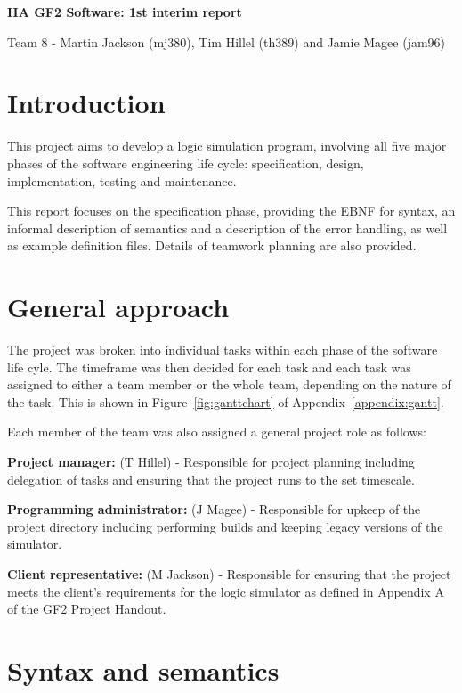 \documentclass[a4paper,10pt]{article}
\begin{document}
\begin{center}
\LARGE \textbf{IIA GF2 Software: 1st interim report}

\small Team 8 - Martin Jackson (mj380), Tim Hillel (th389) and Jamie Magee (jam96)
\end{center}



\section{Introduction}

This project aims to develop a logic simulation program, involving all five major phases of the software engineering life cycle: specification, design, implementation, testing and maintenance.

This report focuses on the specification phase, providing the EBNF for syntax, an informal description of semantics and a description of the error handling, as well as example definition files.
Details of teamwork planning are also provided.

\section{General approach}

The project was broken into individual tasks within each phase of the software life cyle.
The timeframe was then decided for each task and each task was assigned to either a team member or the whole team, depending on the nature of the task.
This is shown in Figure~\ref{fig:ganttchart} of Appendix~\ref{appendix:gantt}.

Each member of the team was also assigned a general project role as follows:

\textbf{Project manager:} (T Hillel) - Responsible for project planning including delegation of tasks and ensuring that the project runs to the set timescale.

\textbf{Programming administrator:} (J Magee) - Responsible for upkeep of the project directory including performing builds and keeping legacy versions of the simulator.

\textbf{Client representative:} (M Jackson) - Responsible for ensuring that the project meets the client's requirements for the logic simulator as defined in Appendix A of the GF2 Project Handout.

\section{Syntax and semantics}
\end{document}
